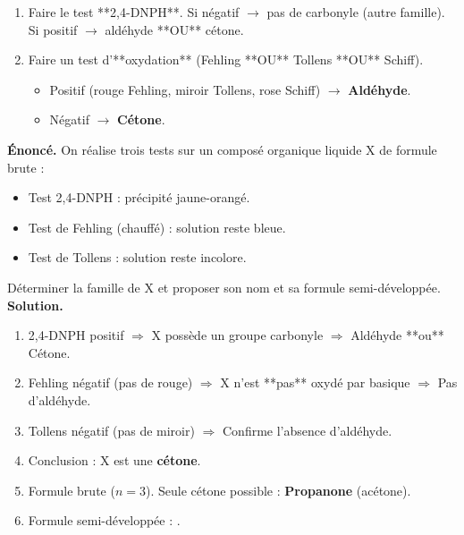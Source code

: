 \documentclass[11pt]{article}
\begin{document}
\begin{methode}
\begin{enumerate}
\item Faire le test **2,4-DNPH**. Si négatif $\rightarrow$ pas de carbonyle (autre famille). Si positif $\rightarrow$ aldéhyde **OU** cétone.
\item Faire un test d'**oxydation** (Fehling **OU** Tollens **OU** Schiff).
      \begin{itemize}
      \item Positif (rouge Fehling, miroir Tollens, rose Schiff) $\rightarrow$ \textbf{Aldéhyde}.
      \item Négatif $\rightarrow$ \textbf{Cétone}.
      \end{itemize}
\end{enumerate}
\end{methode}

\begin{exoresolu}
\textbf{Énoncé.} On réalise trois tests sur un composé organique liquide X de formule brute  :
\begin{itemize}
\item Test 2,4-DNPH : précipité jaune-orangé.
\item Test de Fehling (chauffé) : solution reste bleue.
\item Test de Tollens : solution reste incolore.
\end{itemize}
Déterminer la famille de X et proposer son nom et sa formule semi-développée.
\tcblower
\textbf{Solution.}
\begin{enumerate}
\item 2,4-DNPH positif $\Rightarrow$ X possède un groupe carbonyle $\Rightarrow$ Aldéhyde **ou** Cétone.
\item Fehling négatif (pas de  rouge) $\Rightarrow$ X n'est **pas** oxydé par  basique $\Rightarrow$ Pas d'aldéhyde.
\item Tollens négatif (pas de miroir) $\Rightarrow$ Confirme l'absence d'aldéhyde.
\item Conclusion : X est une \textbf{cétone}.
\item Formule brute  ($n=3$). Seule cétone possible : \textbf{Propanone} (acétone).
\item Formule semi-développée : .
\end{enumerate}
\end{exoresolu}
\end{document}
